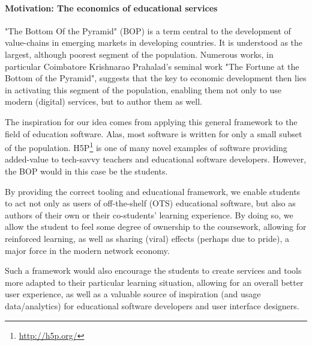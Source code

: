 \paragraph{Motivation: The economics of educational services}

"The Bottom Of the Pyramid" (BOP) is a term central to the development of
value-chains in emerging markets in developing countries. It is understood as
the largest, although poorest segment of the population. Numerous works, in
particular Coimbatore Krishnarao Prahalad's seminal work "The Fortune at the
Bottom of the Pyramid", suggests that the key to economic development then lies
in activating this segment of the population, enabling them not only to use
modern (digital) services, but to author them as 
well\cite{prahalad2009fortune}.

The inspiration for our idea comes from applying this general framework to the
field of education software. Alas, most software is written for only a small
subset of the population. H5P\footnote{\url{http://h5p.org/}} is one of many 
novel examples of software providing added-value to tech-savvy teachers and 
educational software developers. However, the BOP would in this case be the 
students.

By providing the correct tooling and educational framework, we enable students
to act not only as users of off-the-shelf (OTS) educational software, but
also as authors of their own or their co-students' learning experience. By
doing so, we allow the student to feel some degree of ownership to the
coursework, allowing for reinforced learning, as well as sharing (viral) effects
(perhaps due to pride), a major force in the modern network economy.

Such a framework would also encourage the students to create services and tools
more adapted to their particular learning situation, allowing for an overall
better user experience, as well as a valuable source of inspiration (and usage
data/analytics) for educational software developers and user interface
designers.
